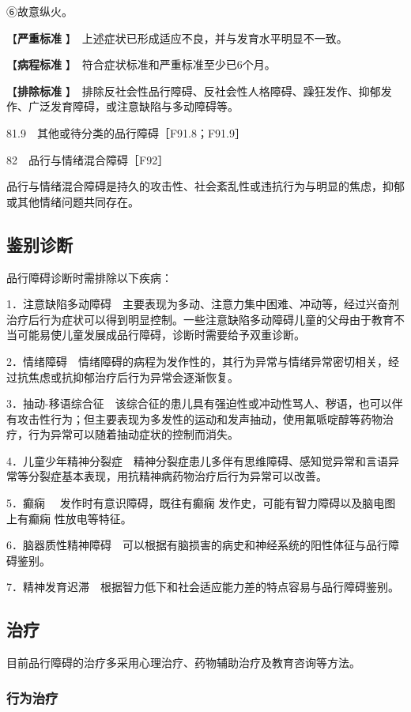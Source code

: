 ⑥故意纵火。

【\textbf{严重标准} 】　上述症状已形成适应不良，并与发育水平明显不一致。

【\textbf{病程标准} 】　符合症状标准和严重标准至少已6个月。

【\textbf{排除标准}
】　排除反社会性品行障碍、反社会性人格障碍、躁狂发作、抑郁发作、广泛发育障碍，或注意缺陷与多动障碍等。

81.9　其他或待分类的品行障碍［F91.8；F91.9］

82　品行与情绪混合障碍［F92］

品行与情绪混合障碍是持久的攻击性、社会紊乱性或违抗行为与明显的焦虑，抑郁或其他情绪问题共同存在。

\subsection{鉴别诊断}

品行障碍诊断时需排除以下疾病：

1．注意缺陷多动障碍　主要表现为多动、注意力集中困难、冲动等，经过兴奋剂治疗后行为症状可以得到明显控制。一些注意缺陷多动障碍儿童的父母由于教育不当可能易使儿童发展成品行障碍，诊断时需要给予双重诊断。

2．情绪障碍　情绪障碍的病程为发作性的，其行为异常与情绪异常密切相关，经过抗焦虑或抗抑郁治疗后行为异常会逐渐恢复。

3．抽动-移语综合征　该综合征的患儿具有强迫性或冲动性骂人、秽语，也可以伴有攻击性行为；但主要表现为多发性的运动和发声抽动，使用氟哌啶醇等药物治疗，行为异常可以随着抽动症状的控制而消失。

4．儿童少年精神分裂症　精神分裂症患儿多伴有思维障碍、感知觉异常和言语异常等分裂症基本表现，用抗精神病药物治疗后行为异常可以改善。

5．癫痫
　发作时有意识障碍，既往有癫痫
发作史，可能有智力障碍以及脑电图上有癫痫
性放电等特征。

6．脑器质性精神障碍　可以根据有脑损害的病史和神经系统的阳性体征与品行障碍鉴别。

7．精神发育迟滞　根据智力低下和社会适应能力差的特点容易与品行障碍鉴别。

\subsection{治疗}

目前品行障碍的治疗多采用心理治疗、药物辅助治疗及教育咨询等方法。

\subsubsection{行为治疗}

